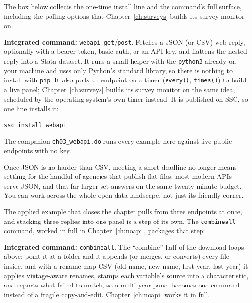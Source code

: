 \documentclass[
    a4paper,
    fontsize=10pt,
    twoside=true,
    numbers=noenddot,
]{kaobook}
\begin{document}
The box below collects the one-time install line and the command's full surface, including the polling options that Chapter~\ref{ch:surveys} builds its survey monitor on.

\begin{kaobox}[frametitle=Package Integration: \texttt{webapi}]
\textbf{Integrated command:} \texttt{webapi get}/\texttt{post}. Fetches a JSON (or CSV) web reply, optionally with a bearer token, basic auth, or an API key, and flattens the nested reply into a Stata dataset. It runs a small helper with the \texttt{python3} already on your machine and uses only Python's standard library, so there is nothing to install with \texttt{pip}. It also polls an endpoint on a timer (\texttt{every()}, \texttt{times()}) to build a live panel; Chapter~\ref{ch:surveys} builds its survey monitor on the same idea, scheduled by the operating system's own timer instead. It is published on SSC, so one line installs it:
\par
{\footnotesize
\begin{verbatim}
ssc install webapi
\end{verbatim}
}
The companion \texttt{ch03\_webapi.do} runs every example here against live public endpoints with no key.
\end{kaobox}

Once JSON is no harder than CSV, meeting a short deadline no longer means settling for the handful of agencies that publish flat files: most modern APIs serve JSON, and that far larger set answers on the same twenty-minute budget. You can work across the whole open-data landscape, not just its friendly corner.

The applied example that closes the chapter pulls from three endpoints at once, and stacking three replies into one panel is a step of its own. The \texttt{combineall} command, worked in full in Chapter~\ref{ch:noapi}, packages that step:

\begin{kaobox}[frametitle=Package Integration: \texttt{combineall}]
\textbf{Integrated command:} \texttt{combineall}. The \enquote{combine} half of the download loops above: point it at a folder and it appends (or merges, or converts) every file inside, and with a rename-map CSV (old name, new name, first year, last year) it applies vintage-aware renames, stamps each variable's source into a characteristic, and reports what failed to match, so a multi-year panel becomes one command instead of a fragile copy-and-edit. Chapter~\ref{ch:noapi} works it in full.
\end{kaobox}
\end{document}
